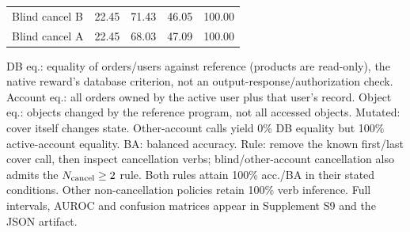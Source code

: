 \begin{table}[t]
\begin{tabularx}{\columnwidth}{@{}Yrrrr@{}}
Blind cancel B & 22.45 & 71.43 & 46.05 & 100.00\\
Blind cancel A & 22.45 & 68.03 & 47.09 & 100.00\\
\bottomrule\end{tabularx}
\par\smallskip\raggedright
DB eq.: equality of orders/users against reference (products are read-only), the native reward's database criterion, not an output-response/authorization check. Account eq.: all orders owned by the active user plus that user's record. Object eq.: objects changed by the reference program, not all accessed objects. Mutated: cover itself changes state. Other-account calls yield 0\% DB equality but 100\% active-account equality. BA: balanced accuracy. Rule: remove the known first/last cover call, then inspect cancellation verbs; blind/other-account cancellation also admits the $N_{\rm cancel}\ge2$ rule. Both rules attain 100\% acc./BA in their stated conditions. Other non-cancellation policies retain 100\% verb inference. Full intervals, AUROC and confusion matrices appear in Supplement S9 and the JSON artifact.
\end{table}
